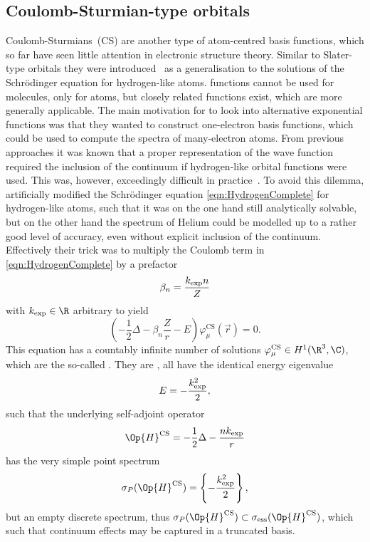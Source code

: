 \subsection{Coulomb-Sturmian-type orbitals}
\label{sec:BasisCS}
Coulomb-Sturmians~(CS) are another type of atom-centred basis functions,
which so far have seen little attention in electronic structure theory.
Similar to Slater-type orbitals
they were introduced~\cite{Shull1959}
as a generalisation to the solutions of the Schrödinger equation for hydrogen-like atoms.
\CS functions cannot be used for molecules, only for atoms,
but closely related functions exist,
which are more generally applicable.
The main motivation for \citet{Shull1959} to look into alternative
exponential functions was that they wanted to construct one-electron basis functions,
which could be used to compute the spectra of many-electron atoms.
From previous approaches it was known that a
proper representation of the wave function
required the inclusion of the continuum
if hydrogen-like orbital functions were used.
This was, however, exceedingly difficult in practice~\cite{Avery2006}.
To avoid this dilemma, \citet{Shull1959} artificially modified
the Schrödinger equation \eqref{eqn:HydrogenComplete}
for hydrogen-like atoms,
such that it was on the one hand still analytically solvable,
but on the other hand the spectrum of Helium could be modelled
up to a rather good level of accuracy,
even without explicit inclusion of the continuum.
Effectively their trick was to multiply the Coulomb term
in \eqref{eqn:HydrogenComplete} by a prefactor
\begin{equation}
	\beta_n = \frac{k_\text{exp} n}{Z}
	\label{eqn:CSbeta}
\end{equation}
with $\kexp \in \R$ arbitrary to yield
\begin{equation}
	\left( - \frac12 \Delta - \beta_n \frac{Z}{r} - E \right) \varphi^\text{CS}_\mu(\vec{r}) = 0.
	\label{eqn:CS}
\end{equation}
This equation has a countably infinite number of solutions
$\varphi^\text{CS}_\mu \in H^1(\R^3, \C)$,
which are the so-called .
They are ,
\ie all have the identical energy eigenvalue
\begin{equation}
	E = -\frac{k_\text{exp}^2}{2},
	\label{eqn:CSenergy}
\end{equation}
such that the underlying self-adjoint operator
\[ \Op{H}^\text{CS} = - \frac12 \Delta - \frac{n\kexp}{r} \]
has the very simple point spectrum
\[ \sigma_P(\Op{H}^\text{CS}) = \left\{ -\frac{\kexp^2}{2} \right\}, \]
but an empty discrete spectrum,
thus $\sigma_P(\Op{H}^\text{CS}) \subset \sigma_\text{ess}(\Op{H}^\text{CS})$,
which such that continuum effects may be captured in a truncated basis.

